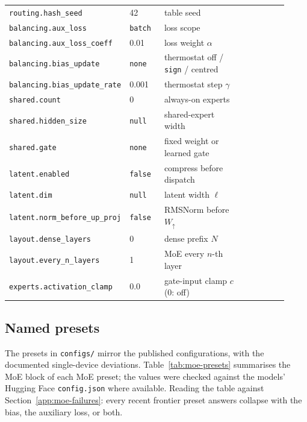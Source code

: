{\begin{longtable}{@{}L{0.27\linewidth}L{0.13\linewidth}L{0.32\linewidth}L{0.20\linewidth}@{}}
\texttt{routing.hash\_seed} & 42 & table seed & \citet{roller2021hash} \\
\texttt{balancing.aux\_loss} & \texttt{batch} & loss scope & \citet{dai2024deepseekmoe,deepseek2024v3} \\
\texttt{balancing.aux\_loss\_coeff} & 0.01 & loss weight $\alpha$ & \citet{deepseek2024v3} \\
\texttt{balancing.bias\_update} & \texttt{none} & thermostat off / \texttt{sign} / centred & \citet{wang2024auxfree} \\
\texttt{balancing.bias\_update\_rate} & 0.001 & thermostat step $\gamma$ & \citet{wang2024auxfree} \\
\texttt{shared.count} & 0 & always-on experts & \citet{dai2024deepseekmoe} \\
\texttt{shared.hidden\_size} & \texttt{null} & shared-expert width & \citet{dai2024deepseekmoe} \\
\texttt{shared.gate} & \texttt{none} & fixed weight or learned gate & \citet{qwen2025qwen3} \\
\texttt{latent.enabled} & \texttt{false} & compress before dispatch & \citet{elango2026latentmoe} \\
\texttt{latent.dim} & \texttt{null} & latent width $\ell$ & \citet{elango2026latentmoe} \\
\texttt{latent.norm\_before\_up\_proj} & \texttt{false} & RMSNorm before $W_\uparrow$ & \citet{kimiteam2026k3} \\
\texttt{layout.dense\_layers} & 0 & dense prefix $N$ & \citet{deepseek2024v3} \\
\texttt{layout.every\_n\_layers} & 1 & MoE every $n$-th layer & \citet{meta2025llama4} \\
\texttt{experts.activation\_clamp} & 0.0 & gate-input clamp $c$ (0: off) & \citet{huang2026step35} \\
\bottomrule
\end{longtable}
}

\subsection{Named presets}
\label{app:moe-presets}

The presets in \texttt{configs/} mirror the published configurations, with
the documented single-device deviations. Table~\ref{tab:moe-presets}
summarises the MoE block of each MoE preset; the values were checked against
the models' Hugging Face \texttt{config.json} where available. Reading the
table against Section~\ref{app:moe-failures}: every recent frontier preset
answers collapse with the bias, the auxiliary loss, or both.


